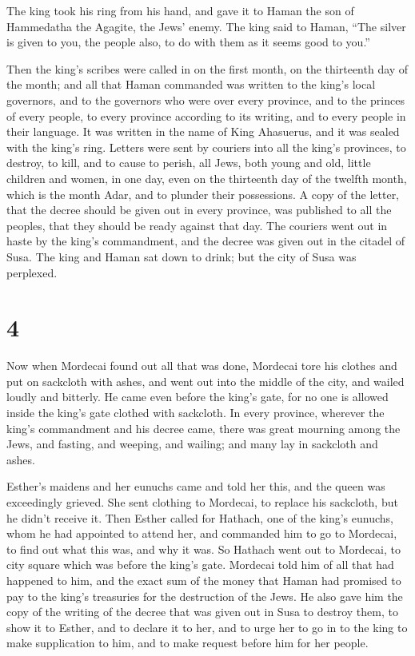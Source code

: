  The king took his ring from his hand, and gave it to
Haman the son of Hammedatha the Agagite, the Jews' enemy.
 The king said to Haman, ``The silver is given to you,
the people also, to do with them as it seems good to you.''

 Then the king's scribes were called in on the first
month, on the thirteenth day of the month; and all that Haman commanded
was written to the king's local governors, and to the governors who were
over every province, and to the princes of every people, to every
province according to its writing, and to every people in their
language. It was written in the name of King Ahasuerus, and it was
sealed with the king's ring.  Letters were sent by
couriers into all the king's provinces, to destroy, to kill, and to
cause to perish, all Jews, both young and old, little children and
women, in one day, even on the thirteenth day of the twelfth month,
which is the month Adar, and to plunder their possessions.
 A copy of the letter, that the decree should be given
out in every province, was published to all the peoples, that they
should be ready against that day.  The couriers went out
in haste by the king's commandment, and the decree was given out in the
citadel of Susa. The king and Haman sat down to drink; but the city of
Susa was perplexed.

\hypertarget{section-3}{%
\section{4}\label{section-3}}

 Now when Mordecai found out all that was done, Mordecai
tore his clothes and put on sackcloth with ashes, and went out into the
middle of the city, and wailed loudly and bitterly.  He
came even before the king's gate, for no one is allowed inside the
king's gate clothed with sackcloth.  In every province,
wherever the king's commandment and his decree came, there was great
mourning among the Jews, and fasting, and weeping, and wailing; and many
lay in sackcloth and ashes.

 Esther's maidens and her eunuchs came and told her this,
and the queen was exceedingly grieved. She sent clothing to Mordecai, to
replace his sackcloth, but he didn't receive it.  Then
Esther called for Hathach, one of the king's eunuchs, whom he had
appointed to attend her, and commanded him to go to Mordecai, to find
out what this was, and why it was.  So Hathach went out to
Mordecai, to city square which was before the king's gate.
 Mordecai told him of all that had happened to him, and
the exact sum of the money that Haman had promised to pay to the king's
treasuries for the destruction of the Jews.  He also gave
him the copy of the writing of the decree that was given out in Susa to
destroy them, to show it to Esther, and to declare it to her, and to
urge her to go in to the king to make supplication to him, and to make
request before him for her people.

